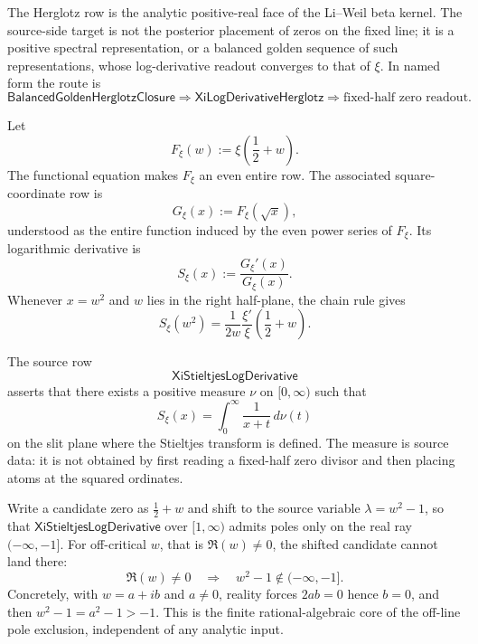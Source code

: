 \begin{principle}
\label{prin:rh-herglotz-target-li-weil-source-positivity}
The Herglotz row is the analytic positive-real face of the Li--Weil beta
kernel.  The source-side target is not the posterior placement of zeros
on the fixed line; it is a positive spectral representation, or a
balanced golden sequence of such representations, whose log-derivative
readout converges to that of $\xi$.  In named form the route is
$$
\mathsf{BalancedGoldenHerglotzClosure}
\Longrightarrow
\mathsf{XiLogDerivativeHerglotz}
\Longrightarrow
\text{fixed-half zero readout}.
$$
\end{principle}

\begin{definition}
\label{def:rh-centered-xi-square-coordinate}
Let
$$
F_\xi(w):=\xi\left(\frac12+w\right).
$$
The functional equation makes $F_\xi$ an even entire row.  The associated
square-coordinate row is
$$
G_\xi(x):=F_\xi(\sqrt{x}),
$$
understood as the entire function induced by the even power series of
$F_\xi$.  Its logarithmic derivative is
$$
S_\xi(x):=\frac{G_\xi'(x)}{G_\xi(x)}.
$$
Whenever $x=w^2$ and $w$ lies in the right half-plane, the chain rule
gives
$$
S_\xi(w^2)
=
\frac{1}{2w}
\frac{\xi'}{\xi}\left(\frac12+w\right).
$$
\end{definition}

\begin{definition}
\label{def:rh-xi-stieltjes-log-derivative-row}
The source row
$$
\mathsf{XiStieltjesLogDerivative}
$$
asserts that there exists a positive measure $\nu$ on $[0,\infty)$ such
that
$$
S_\xi(x)
=
\int_0^\infty\frac{1}{x+t}\,d\nu(t)
$$
on the slit plane where the Stieltjes transform is defined.  The measure
is source data: it is not obtained by first reading a fixed-half zero
divisor and then placing atoms at the squared ordinates.
\end{definition}

\begin{lemma}
\label{lem:rh-stieltjes-pole-location-kernel}
Write a candidate zero as $\tfrac12+w$ and shift to the source variable
$\lambda=w^2-1$, so that $\mathsf{XiStieltjesLogDerivative}$ over $[1,\infty)$
admits poles only on the real ray $(-\infty,-1]$.  For off-critical $w$, that
is $\Re(w)\neq0$, the shifted candidate cannot land there:
$$
\Re(w)\neq0
\quad\Longrightarrow\quad
w^2-1\notin(-\infty,-1].
$$
Concretely, with $w=a+ib$ and $a\neq0$, reality forces $2ab=0$ hence $b=0$,
and then $w^2-1=a^2-1>-1$.  This is the finite rational-algebraic core of the
off-line pole exclusion, independent of any analytic input.
\end{lemma}

